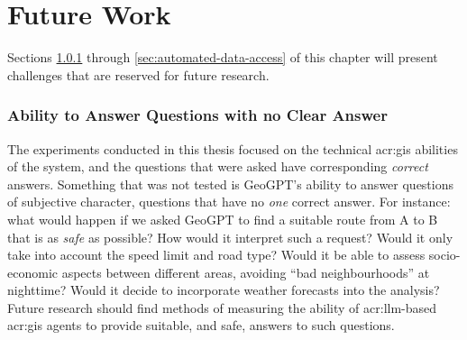 \chapter{Future Work}
\label{cha:future-work}

\begin{comment}
Consider where you would like to extend or improve this work, or how somebody else could continue it.
These extensions might either be continuing the ongoing direction or taking a side direction that became obvious during the work.
Further, possible solutions to limitations in the work conducted, highlighted in Section~\ref{sec:discussion} may be presented.

Note that in the Specialisation Project Report, the Future Work section will be a key part of your plan for the novel work to be carried out in the next semester,
while in the Master's Thesis, the Future Work section rather will point to issues that others might be interested in addressing.
This can include options and alternatives that you did not try out yourself, or potential improvements and extensions to your experiments or system.
\end{comment}

Sections \ref{sec:no-clear-answer} through \ref{sec:automated-data-access} of this chapter will present challenges that are reserved for future research.

\subsection{Ability to Answer Questions with no Clear Answer}
\label{sec:no-clear-answer}

The experiments conducted in this thesis focused on the technical \acrshort{acr:gis} abilities of the system, and the questions that were asked have corresponding \textit{correct} answers. Something that was not tested is GeoGPT's ability to answer questions of subjective character, questions that have no \textit{one} correct answer. For instance: what would happen if we asked GeoGPT to find a suitable route from A to B that is as \textit{safe} as possible? How would it interpret such a request? Would it only take into account the speed limit and road type? Would it be able to assess socio-economic aspects between different areas, avoiding \enquote{bad neighbourhoods} at nighttime? Would it decide to incorporate weather forecasts into the analysis? Future research should find methods of measuring the ability of \acrshort{acr:llm}-based \acrshort{acr:gis} agents to provide suitable, and safe, answers to such questions.

